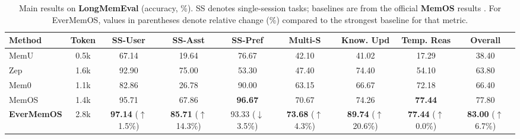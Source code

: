 \begin{table}[!h]
    \centering
    \small
    \setlength{\tabcolsep}{2pt}
    \begin{tabular}{@{}l c ccccccc@{}}
    \toprule
    \textbf{Method} & \textbf{Token} & \textbf{SS-User} & \textbf{SS-Asst} & \textbf{SS-Pref} & \textbf{Multi-S} & \textbf{Know. Upd} & \textbf{Temp. Reas} & \textbf{Overall} \\
    \midrule
    MemU & 0.5k & 67.14 & 19.64 & 76.67 & 42.10 & 41.02 & 17.29 & 38.40 \\
    Zep & 1.6k & 92.90 & 75.00 & 53.30 & 47.40 & 74.40 & 54.10 & 63.80 \\
    Mem0 & 1.1k & 82.86 & 26.78 & 90.00 & 63.15 & 66.67 & 72.18 & 66.40 \\
    MemOS & 1.4k & 95.71 & 67.86 & \textbf{96.67} & 70.67 & 74.26 & \textbf{77.44} & 77.80 \\
    \textbf{EverMemOS} & 2.8k & \textbf{97.14} {\tiny ($\uparrow$1.5\%)} & \textbf{85.71} {\tiny ($\uparrow$14.3\%)} & 93.33 {\tiny ($\downarrow$3.5\%)} & \textbf{73.68} {\tiny ($\uparrow$4.3\%)} & \textbf{89.74} {\tiny ($\uparrow$20.6\%)} & \textbf{77.44} {\tiny ($\uparrow$0.0\%)} & \textbf{83.00} {\tiny ($\uparrow$6.7\%)} \\
    \bottomrule
    \end{tabular}
    \caption{Main results on \textbf{LongMemEval} (accuracy, \%). SS denotes single-session tasks; baselines are from the official \textbf{MemOS} results \cite{li2025memos}. For EverMemOS, values in parentheses denote relative change (\%) compared to the strongest baseline for that metric.}
    \label{tab:longmemeval-main}
\end{table}